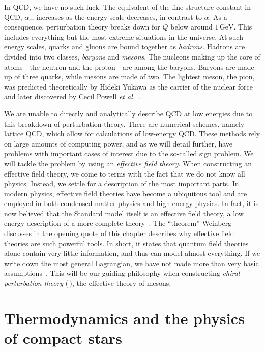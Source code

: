 In QCD, we have no such luck.
The equivalent of the fine-structure constant in QCD, $\alpha_s$, increases as the energy scale decreases, in contrast to $\alpha$.
As a consequence, perturbation theory breaks down for $Q$ below around $1\,\text{GeV}$.
This includes everything but the most extreme situations in the universe.
At such energy scales, quarks and gluons are bound together as \emph{hadrons}.
Hadrons are divided into two classes, \emph{baryons} and \emph{mesons}.
The nucleons making up the core of atoms---the neutron and the proton---are among the baryons.
Baryons are made up of three quarks, while mesons are made of two.
The lightest meson, the pion, was predicted theoretically by Hideki Yukawa as the carrier of the nuclear force and later discovered by Cecil Powell \emph{et al.}~\autocite{griffithsIntroductionElementaryParticles2008}.

We are unable to directly and analytically describe QCD at low energies due to this breakdown of perturbation theory.
There are numerical schemes, namely lattice QCD, which allow for calculations of low-energy QCD.
These methods rely on large amounts of computing power, and as we will detail further, have problems with important cases of interest due to the so-called sign problem.
We will tackle the problem by using an \emph{effective field theory}.
When constructing an effective field theory, we come to terms with the fact that we do not know all physics.
Instead, we settle for a description of the most important parts.
In modern physics, effective field theories have become a ubiquitous tool and are employed in both condensed matter physics and high-energy physics.
In fact, it is now believed that the Standard model itself is an effective field theory, a low energy description of a more complete theory~\autocite{pencoIntroductionEffectiveField2020,weinbergDevelopmentEffectiveField2021}.
The ``theorem'' Weinberg discusses in the opening quote of this chapter describes why effective field theories are such powerful tools.
In short, it states that quantum field theories alone contain very little information, and thus can model almost everything.
If we write down the most general Lagrangian, we have not made more than very basic assumptions~\autocite{weinbergPhenomenologicalLagrangians1979a}.
This will be our guiding philosophy when constructing \emph{chiral perturbation theory} (\chpt\,), the effective theory of mesons.




\section{Thermodynamics and the physics of compact stars}


